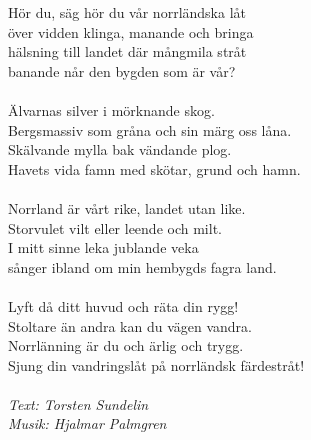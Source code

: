 \vspace{10pt}
Hör du, säg hör du vår norrländska låt\\
över vidden klinga, manande och bringa\\
hälsning till landet där mångmila stråt\\
banande når den bygden som är vår?\\
\\
Älvarnas silver i mörknande skog.\\
Bergsmassiv som gråna och sin märg oss låna.\\
Skälvande mylla bak vändande plog.\\
Havets vida famn med skötar, grund och hamn.\\
\\
Norrland är vårt rike, landet utan like.\\
Storvulet vilt eller leende och milt.\\
I mitt sinne leka jublande veka\\
sånger ibland om min hembygds fagra land.\\
\\
Lyft då ditt huvud och räta din rygg!\\
Stoltare än andra kan du vägen vandra.\\
Norrlänning är du och ärlig och trygg.\\
Sjung din vandringslåt på norrländsk färdestråt!\\
\\
{\footnotesize\textit{Text: Torsten Sundelin\\
Musik: Hjalmar Palmgren}}
